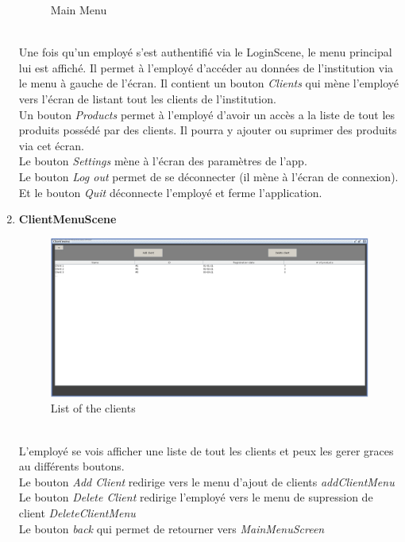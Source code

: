 \documentclass[../rapport.tex]{subfiles}
\begin{document}
\begin{enumerate}
\begin{figure}[h!]
				\caption{Main Menu}
		\end{figure}
		\\
Une fois qu'un employé s'est authentifié via le LoginScene, le menu principal lui est affiché. Il permet à l'employé d'accéder au données de l'institution via le menu à 
gauche de l'écran. Il contient un bouton \textit{Clients} qui mène l'employé vers l'écran de listant tout les clients de l'institution.\\
Un bouton \textit{Products} permet à l'employé d'avoir un accès a la liste de tout les produits possédé par des clients. Il pourra y ajouter ou suprimer des produits via cet écran.\\
Le bouton \textit{Settings} mène à l'écran des paramètres de l'app.\\
Le bouton \textit{Log out} permet de se déconnecter (il mène à l'écran de connexion).\\
Et le bouton \textit{Quit} déconnecte l'employé et ferme l'application.
\newpage
\item \textbf{ClientMenuScene} \\
		\begin{figure}[h!]
				\centering \includegraphics[scale=0.2]{ressources/photos_diagrammes/app2/gui/Clients menu scene.jpg}
				\caption{List of the clients}
		\end{figure}
		\\
L'employé se vois afficher une liste de tout les clients et peux les gerer graces au différents boutons.\\
Le bouton \textit{Add Client} redirige vers le menu d'ajout de clients \textit{addClientMenu}\\
Le bouton \textit{Delete Client} redirige l'employé vers  le menu de supression de client \textit{DeleteClientMenu}\\
Le bouton \textit{back} qui permet de retourner vers \textit{MainMenuScreen}\\

\end{enumerate}
\end{document}

